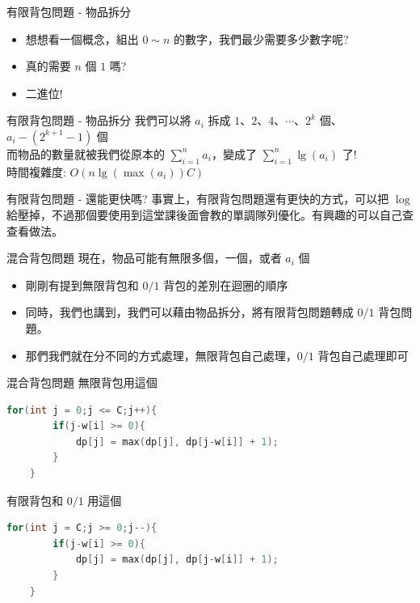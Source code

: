 \documentclass[aspectratio=169]{beamer}
\begin{document}
\begin{frame}[fragile]{有限背包問題 - 物品拆分}
    \begin{itemize}
        \item<1-> 想想看一個概念，組出 $0 \sim n$ 的數字，我們最少需要多少數字呢?
        \item<2-> 真的需要 $n$ 個 $1$ 嗎?
        \item<3-> 二進位!
    \end{itemize}
\end{frame} 

\begin{frame}[fragile]{有限背包問題 - 物品拆分}
    我們可以將 $a_i$ 拆成 $1$、$2$、$4$、$\cdots$、$2^k$ 個、$a_i-(2^{k+1}-1)$ 個 \\
    \vspace{5mm}
    而物品的數量就被我們從原本的 $\sum_{i=1}^n a_i$，變成了 $\sum_{i=1}^n \lg(a_i)$ 了! \\
    時間複雜度: $O(n \lg(\max(a_i)) C)$
\end{frame} 

\begin{frame}[fragile]{有限背包問題 - 還能更快嗎?}
    事實上，有限背包問題還有更快的方式，可以把 $\log$ 給壓掉，不過那個要使用到這堂課後面會教的單調隊列優化。有興趣的可以自己查查看做法。
\end{frame} 

\begin{frame}[fragile]{混合背包問題}
    現在，物品可能有無限多個，一個，或者 $a_i$ 個
    \begin{itemize}
        \item 剛剛有提到無限背包和 $0/1$ 背包的差別在迴圈的順序 
        \item 同時，我們也講到，我們可以藉由物品拆分，將有限背包問題轉成 $0/1$ 背包問題。
        \item 那們我們就在分不同的方式處理，無限背包自己處理，$0/1$ 背包自己處理即可
    \end{itemize}
\end{frame} 

\begin{frame}[fragile]{混合背包問題}
    無限背包用這個 
    \begin{lstlisting}[language=C++]
    for(int j = 0;j <= C;j++){
        if(j-w[i] >= 0){
            dp[j] = max(dp[j], dp[j-w[i]] + 1);
        }
    }
    \end{lstlisting}
    有限背包和 $0/1$ 用這個
    \begin{lstlisting}[language=C++]
    for(int j = C;j >= 0;j--){
        if(j-w[i] >= 0){
            dp[j] = max(dp[j], dp[j-w[i]] + 1);
        }
    }
    \end{lstlisting}
\end{frame} 
\end{document}
